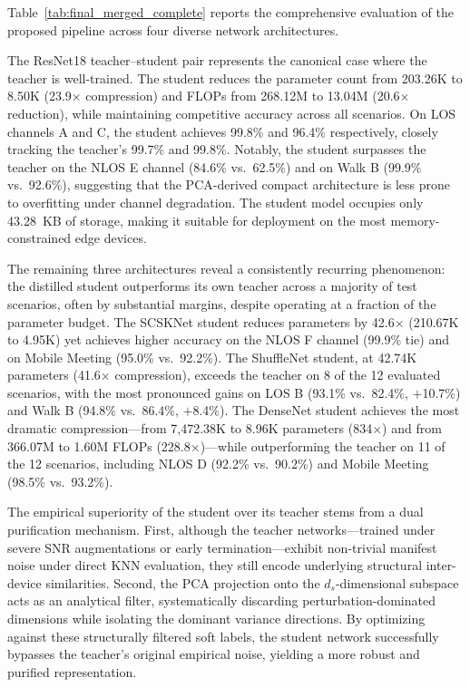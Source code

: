 \documentclass[10pt, conference]{IEEEtran}
\begin{document}
Table~\ref{tab:final_merged_complete} reports the comprehensive evaluation of the proposed pipeline across four diverse network architectures.

The ResNet18 teacher--student pair represents the canonical case where the teacher is well-trained.
The student reduces the parameter count from 203.26K to 8.50K (23.9$\times$ compression) and FLOPs from 268.12M to 13.04M (20.6$\times$ reduction), while maintaining competitive accuracy across all scenarios.
On LOS channels A and C, the student achieves 99.8\% and 96.4\% respectively, closely tracking the teacher's 99.7\% and 99.8\%.
Notably, the student surpasses the teacher on the NLOS E channel (84.6\% vs.\ 62.5\%) and on Walk B (99.9\% vs.\ 92.6\%), suggesting that the PCA-derived compact architecture is less prone to overfitting under channel degradation.
The student model occupies only 43.28~KB of storage, making it suitable for deployment on the most memory-constrained edge devices.

The remaining three architectures reveal a consistently recurring phenomenon: the distilled student outperforms its own teacher across a majority of test scenarios, often by substantial margins, despite operating at a fraction of the parameter budget.
The SCSKNet student reduces parameters by 42.6$\times$ (210.67K to 4.95K) yet achieves higher accuracy on the NLOS F channel (99.9\% tie) and on Mobile Meeting (95.0\% vs.\ 92.2\%).
The ShuffleNet student, at 42.74K parameters (41.6$\times$ compression), exceeds the teacher on 8 of the 12 evaluated scenarios, with the most pronounced gains on LOS B (93.1\% vs.\ 82.4\%, $+$10.7\%) and Walk B (94.8\% vs.\ 86.4\%, $+$8.4\%).
The DenseNet student achieves the most dramatic compression---from 7,472.38K to 8.96K parameters (834$\times$) and from 366.07M to 1.60M FLOPs (228.8$\times$)---while outperforming the teacher on 11 of the 12 scenarios, including NLOS D (92.2\% vs.\ 90.2\%) and Mobile Meeting (98.5\% vs.\ 93.2\%).

The empirical superiority of the student over its teacher stems from a dual purification mechanism. First, although the teacher networks—trained under severe SNR augmentations or early termination—exhibit non-trivial manifest noise under direct KNN evaluation, they still encode underlying structural inter-device similarities. Second, the PCA projection onto the $d_s$-dimensional subspace acts as an analytical filter, systematically discarding perturbation-dominated dimensions while isolating the dominant variance directions. By optimizing against these structurally filtered soft labels, the student network successfully bypasses the teacher's original empirical noise, yielding a more robust and purified representation.
\end{document}
